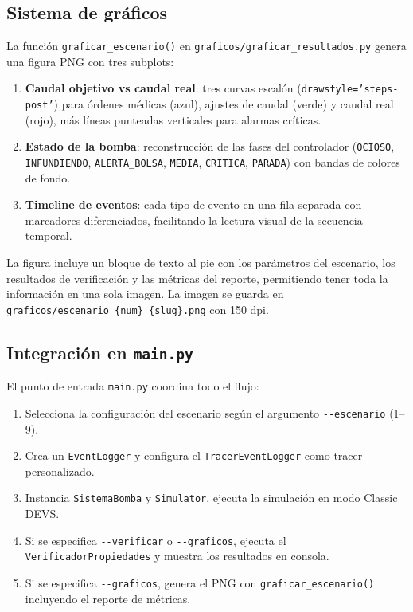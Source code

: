 \documentclass[12pt,a4paper]{article}
\begin{document}
\subsection{Sistema de gráficos}

La función \texttt{graficar\_escenario()} en
\texttt{graficos/graficar\_resultados.py} genera una figura PNG con
tres subplots:

\begin{enumerate}
    \item \textbf{Caudal objetivo vs caudal real}: tres curvas
    escalón (\texttt{drawstyle='steps-post'}) para órdenes médicas
    (azul), ajustes de caudal (verde) y caudal real (rojo), más
    líneas punteadas verticales para alarmas críticas.
    \item \textbf{Estado de la bomba}: reconstrucción de las fases
    del controlador (\texttt{OCIOSO}, \texttt{INFUNDIENDO},
    \texttt{ALERTA\_BOLSA}, \texttt{MEDIA}, \texttt{CRITICA},
    \texttt{PARADA}) con bandas de colores de fondo.
    \item \textbf{Timeline de eventos}: cada tipo de evento en una
    fila separada con marcadores diferenciados, facilitando la
    lectura visual de la secuencia temporal.
\end{enumerate}

La figura incluye un bloque de texto al pie con los parámetros del
escenario, los resultados de verificación y las métricas del
reporte, permitiendo tener toda la información en una sola imagen.
La imagen se guarda en \texttt{graficos/escenario\_\{num\}\_\{slug\}.png}
con 150 dpi.

\subsection{Integración en \texttt{main.py}}

El punto de entrada \texttt{main.py} coordina todo el flujo:

\begin{enumerate}
    \item Selecciona la configuración del escenario según el
    argumento \texttt{-{}-escenario} (1--9).
    \item Crea un \texttt{EventLogger} y configura el
    \texttt{TracerEventLogger} como tracer personalizado.
    \item Instancia \texttt{SistemaBomba} y \texttt{Simulator},
    ejecuta la simulación en modo Classic DEVS.
    \item Si se especifica \texttt{-{}-verificar} o
    \texttt{-{}-graficos}, ejecuta el \texttt{VerificadorPropiedades}
    y muestra los resultados en consola.
    \item Si se especifica \texttt{-{}-graficos}, genera el PNG con
    \texttt{graficar\_escenario()} incluyendo el reporte de
    métricas.
\end{enumerate}
\end{document}
